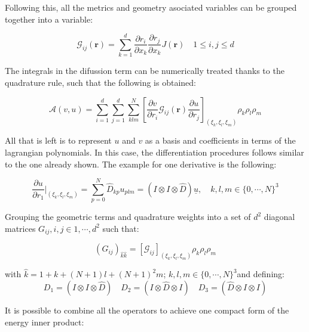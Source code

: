 \documentclass[
]{scrartcl}
\begin{document}
Following this, all the metrics and geometry asociated variables can be
grouped together into a variable:

\begin{equation}
\mathcal{G}_{ij}(\textbf{r})=\sum_{k=1}^{d}\frac{\partial r_i}{\partial x_k}\frac{\partial r_j}{\partial x_k} J(\textbf{r}) \quad 1 \leq i,j \leq d
\end{equation}

The integrals in the difussion term can be numerically treated thanks to
the quadrature rule, such that the following is obtained:

\begin{equation}
    \mathcal{A}(v,u)=\sum_{i=1}^{d} \sum_{j=1}^{d} \sum_{klm}^{N} \left[ \frac{\partial v}{\partial r_i}  \mathcal{G}_{ij}(\textbf{r}) \frac{\partial u}{\partial r_j} \right]_{(\xi_k,\xi_l,\xi_m)} \rho_k \rho_l \rho_m 
\end{equation}

All that is left is to represent \(u\) and \(v\) as a basis and
coefficients in terms of the lagrangian polynomials. In this case, the
differentiation procedures follows similar to the one already shown. The
example for one derivative is the following:

\begin{equation}
    \frac{\partial u}{\partial r_1}\rvert_{(\xi_k,\xi_l,\xi_m)}=\sum_{p=0}^{N} \hat{D}_{kp}u_{plm}= (I \otimes I \otimes \hat{D})\underline{u}, \quad k,l,m \in \{0, \cdots, N\}^{3}
\end{equation}

Grouping the geometric terms and quadrature weights into a set of
\(d^2\) diagonal matrices \(G_{ij}, i,j \in {1,\cdots, d^2}\) such that:

\begin{equation}
    (G_{ij})_{\hat{k}\hat{k}}=\left[ \mathcal{G}_{ij}  \right]_{(\xi_k,\xi_l,\xi_m)} \rho_k \rho_l \rho_m
\end{equation}

with \(\hat{k}=1+k+(N+1)l+(N+1)^{2}m\);
\(k,l,m \in \{0, \cdots, N \}^{3}\)and defining: \begin{equation}
    D_1=(I \otimes I \otimes \hat{D}) \quad D_2=(I \otimes \hat{D} \otimes I) \quad D_3=(\hat{D} \otimes I \otimes I)
\end{equation}

It is possible to combine all the operators to achieve one compact form
of the energy inner product:
\end{document}
